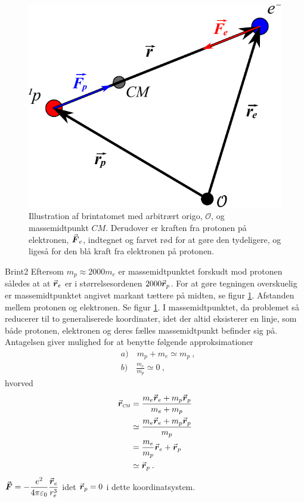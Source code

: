 \begin{figure}
	\centering
	\includegraphics[width=.6\textwidth]{Analytisk-Mekanik/Brint.pdf}
	\caption{Illustration af brintatomet med arbitrært origo, $\mathcal{O}$, og massemidtpunkt $CM$. Derudover er kraften fra protonen på elektronen, ${\vec{\boldsymbol{F}}}_e$, indtegnet og farvet rød for at gøre den tydeligere, og ligeså for den blå kraft fra elektronen på protonen.}
	\label{fig:Brint}
\end{figure}
%
%
\begin{opgave}{Brint}{2}
\opg Eftersom $m_p\approx2000m_e$ er massemidtpunktet forskudt mod protonen således at at ${\vec{\boldsymbol{r}}}_e$ er i størrelsesordenen $2000{\vec{\boldsymbol{r}}}_p$. For at gøre tegningen overskuelig er massemidtpunktet angivet markant tættere på midten, se figur \ref{fig:Brint}.
\opg Afstanden mellem protonen og elektronen.
\opg Se figur \ref{fig:Brint}.
\opg I massemidtpunktet, da problemet så reducerer til to generaliserede koordinater, idet der altid eksisterer en linje, som både protonen, elektronen og deres fælles massemidtpunkt befinder sig på.
\opg Antagelsen giver mulighed for at benytte følgende approksimationer
\begin{align*}
	&a) \quad m_p + m_e \simeq m_p \: , \\
	&b) \quad \frac{m_e}{m_p} \simeq 0 \: ,
\end{align*}
hvorved
\begin{align*}
	{\vec{\boldsymbol{r}}}_\textsc{cm} &= \frac{m_e{\vec{\boldsymbol{r}}}_e + m_p{\vec{\boldsymbol{r}}}_p}{m_e + m_p} \\
	&\simeq \frac{m_e{\vec{\boldsymbol{r}}}_e + m_p{\vec{\boldsymbol{r}}}_p}{m_p} \\
	&= \frac{m_e}{m_p}{\vec{\boldsymbol{r}}}_e + {\vec{\boldsymbol{r}}}_p \\
	&\simeq {\vec{\boldsymbol{r}}}_p \: .
\end{align*}
\opg ${\vec{\boldsymbol{F}}} = -\dfrac{e^2}{4\pi\varepsilon_0}\dfrac{{\vec{\boldsymbol{r}}}_e}{r_e^3}$ idet ${\vec{\boldsymbol{r}}}_p = 0$ i dette koordinatsystem.
\end{opgave}
%
%
